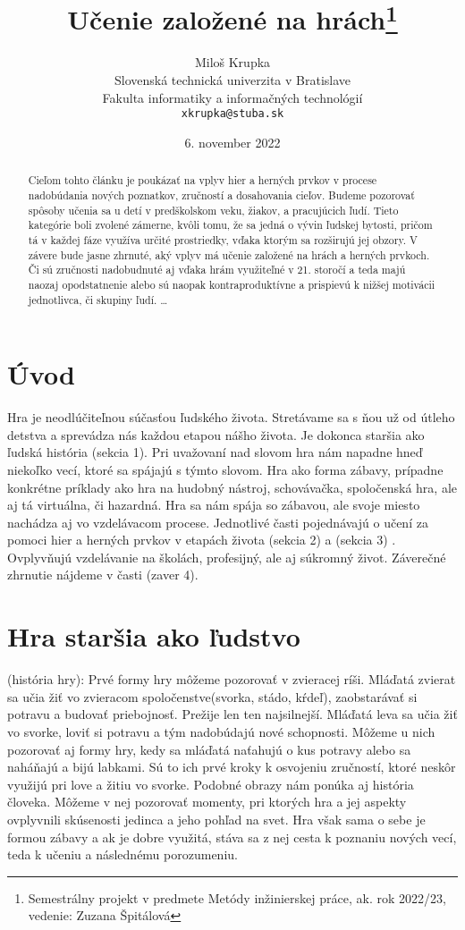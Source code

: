 \documentclass[10pt,twoside,slovak,a4paper]{article}
\title{Učenie založené na hrách\thanks{Semestrálny projekt v predmete Metódy inžinierskej práce, ak. rok 2022/23, vedenie: Zuzana Špitálová}} %
\author{Miloš Krupka\\[2pt]
	{\small Slovenská technická univerzita v Bratislave}\\
	{\small Fakulta informatiky a informačných technológií}\\
	{\small \texttt{xkrupka@stuba.sk}}
	}
\date{\small 6. november 2022} %
\begin{document}
\maketitle

\begin{abstract}
Cieľom tohto článku je poukázať na vplyv hier a herných prvkov v procese nadobúdania nových poznatkov, zručností a dosahovania cieľov. Budeme pozorovať spôsoby učenia sa u detí v predškolskom veku, žiakov, a pracujúcich ľudí.  Tieto kategórie boli zvolené zámerne, kvôli tomu, že sa jedná o vývin ľudskej bytosti, pričom tá v každej fáze využíva určité prostriedky, vďaka ktorým sa rozširujú jej obzory.  V závere bude jasne zhrnuté, aký vplyv má učenie založené na hrách a herných prvkoch. Či sú zručnosti nadobudnuté aj vďaka hrám využiteľné v 21. storočí a teda majú naozaj opodstatnenie alebo sú naopak kontraproduktívne a prispievú k nižšej motivácii jednotlivca, či skupiny ľudí.
\ldots
\end{abstract}



\section{Úvod}
Hra je neodlúčiteľnou súčasťou ľudského života. Stretávame sa s ňou už od útleho detstva a sprevádza nás každou etapou nášho života. Je dokonca staršia ako ľudská história (sekcia 1). Pri uvažovaní nad slovom hra nám napadne hneď niekoľko vecí, ktoré sa spájajú s týmto slovom. Hra ako forma zábavy, prípadne konkrétne príklady ako hra na hudobný nástroj, schovávačka, spoločenská hra, ale aj tá virtuálna, či hazardná. Hra sa nám spája so zábavou, ale svoje miesto nachádza aj vo vzdelávacom procese. Jednotlivé časti pojednávajú o učení za pomoci hier a herných prvkov v etapách života (sekcia 2) a (sekcia 3) . Ovplyvňujú vzdelávanie na školách, profesijný, ale aj súkromný život.  Záverečné zhrnutie nájdeme v časti (zaver 4).



\section{Hra staršia ako ľudstvo} \label{historia}

(história hry):
Prvé formy hry môžeme pozorovať v zvieracej ríši. Mláďatá zvierat sa učia žiť vo zvieracom spoločenstve(svorka, stádo, kŕdeľ), zaobstarávať si potravu a budovať priebojnosť. Prežije len ten najsilnejší. Mláďatá leva sa učia žiť vo svorke, loviť si potravu a tým nadobúdajú nové schopnosti. Môžeme u nich pozorovať aj formy hry, kedy sa mláďatá naťahujú o kus potravy alebo sa naháňajú a bijú labkami. Sú to ich prvé kroky k osvojeniu zručností, ktoré neskôr využijú pri love a žitiu vo svorke. Podobné obrazy nám ponúka aj história človeka. Môžeme v nej pozorovať momenty, pri ktorých hra a jej aspekty ovplyvnili skúsenosti jedinca a jeho pohľad na svet. Hra však sama o sebe je formou zábavy a ak je dobre využitá, stáva sa z nej cesta k poznaniu nových vecí, teda k učeniu a následnému porozumeniu. 
\end{document}
